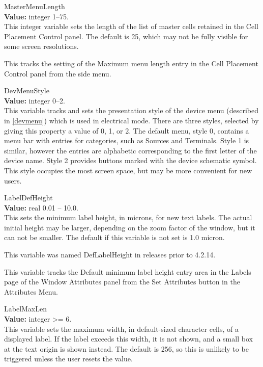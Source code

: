 \begin{description}
\item{\et MasterMenuLength}\\
{\bf Value:} integer 1--75.\\
This integer variable sets the length of the list of master cells
retained in the {\cb Cell Placement Control} panel.  The default is
25, which may not be fully visible for some screen resolutions.

This tracks the setting of the {\cb Maximum menu length} entry in the
{\cb Cell Placement Control} panel from the side menu.

\item{\et DevMenuStyle}\\
{\bf Value:} integer 0--2.\\
This variable tracks and sets the presentation style of the device
menu (described in \ref{devmenu}) which is used in electrical mode. 
There are three styles, selected by giving this property a value of 0,
1, or 2.  The default menu, style 0, contains a menu bar with entries
for categories, such as {\cb Sources} and {\cb Terminals}.  Style 1 is
similar, however the entries are alphabetic corresponding to the first
letter of the device name.  Style 2 provides buttons marked with the
device schematic symbol.  This style occupies the most screen space,
but may be more convenient for new users.

\item{\et LabelDefHeight}\\
{\bf Value:} real 0.01 -- 10.0.\\
This sets the minimum label height, in microns, for new text labels. 
The actual initial height may be larger, depending on the zoom factor
of the window, but it can not be smaller.  The default if this
variable is not set is 1.0 micron.

This variable was named {\et DefLabelHeight} in releases prior to
4.2.14.

This variable tracks the {\cb Default minimum label height} entry area
in the {\cb Labels} page of the {\cb Window Attributes} panel from the
{\cb Set Attributes} button in the {\cb Attributes Menu}.

\item{\et LabelMaxLen}\\
{\bf Value:} integer {\vt >=} 6.\\
This variable sets the maximum width, in default-sized character
cells, of a displayed label.  If the label exceeds this width, it is
not shown, and a small box at the text origin is shown instead.  The
default is 256, so this is unlikely to be triggered unless the user
resets the value.


\end{description}
